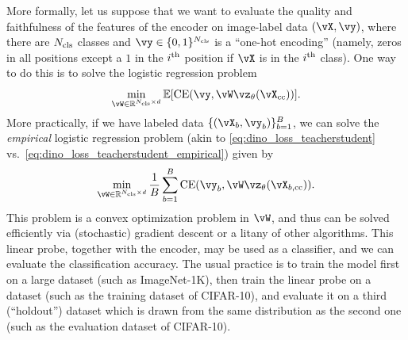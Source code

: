 \documentclass[../../book-main.tex]{subfiles}
\begin{document}
More formally, let us suppose that we want to evaluate the quality and faithfulness of the features of the encoder on image-label data \((\vX, \vy)\), where there are \(N_{\mathrm{cls}}\) classes and \(\vy \in \{0, 1\}^{N_{\cls}}\) is a ``one-hot encoding'' (namely, zeros in all positions except a \(1\) in the \(i^{\textnormal{th}}\) position if \(\vX\) is in the \(i^{\textnormal{th}}\) class). One way to do this is to solve the logistic regression problem 
\begin{equation}\label{eq:linear_probing}
    \min_{\vW \in \R^{N_{\cls} \times d}}\Ex[\CE(\vy, \vW \vz_{\theta}(\vX_{\cc}))].
\end{equation}
More practically, if we have labeled data \(\{(\vX_{b}, \vy_{b})\}_{b = 1}^{B}\), we can solve the \textit{empirical} logistic regression problem (akin to \eqref{eq:dino_loss_teacherstudent} vs.~\eqref{eq:dino_loss_teacherstudent_empirical}) given by 
\begin{equation}\label{eq:linear_probing_empirical}
    \min_{\vW \in \R^{N_{\cls} \times d}}\frac{1}{B}\sum_{b = 1}^{B}\CE(\vy_{b}, \vW \vz_{\theta}(\vX_{b, \cc})).
\end{equation}
This problem is a convex optimization problem in \(\vW\), and thus can be solved efficiently via (stochastic) gradient descent or a litany of other algorithms. This linear probe, together with the encoder, may be used as a classifier, and we can evaluate the classification accuracy. The usual practice is to train the model first on a large dataset (such as ImageNet-1K), then train the linear probe on a dataset (such as the training dataset of CIFAR-10), and evaluate it on a third (``holdout'') dataset which is drawn from the same distribution as the second one (such as the evaluation dataset of CIFAR-10).
\end{document}
